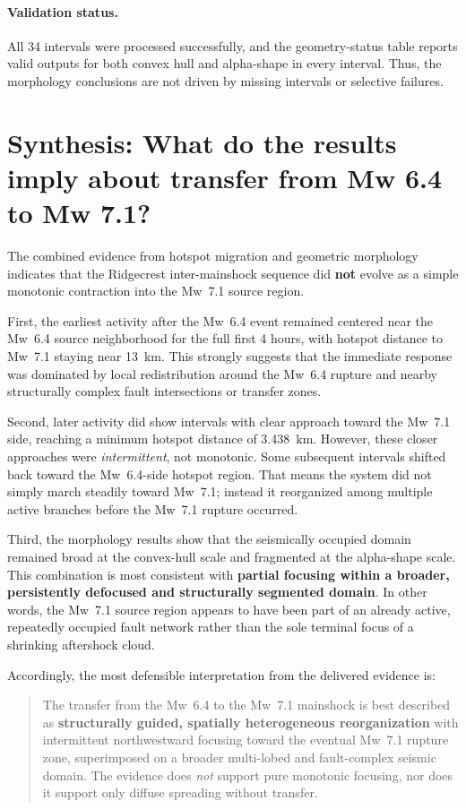 \documentclass[11pt]{article}
\begin{document}
\paragraph{Validation status.}
All 34 intervals were processed successfully, and the geometry-status table reports valid outputs for both convex hull and alpha-shape in every interval. Thus, the morphology conclusions are not driven by missing intervals or selective failures.

\section{Synthesis: What do the results imply about transfer from Mw 6.4 to Mw 7.1?}
The combined evidence from hotspot migration and geometric morphology indicates that the Ridgecrest inter-mainshock sequence did \textbf{not} evolve as a simple monotonic contraction into the Mw~7.1 source region.

First, the earliest activity after the Mw~6.4 event remained centered near the Mw~6.4 source neighborhood for the full first 4 hours, with hotspot distance to Mw~7.1 staying near 13~km. This strongly suggests that the immediate response was dominated by local redistribution around the Mw~6.4 rupture and nearby structurally complex fault intersections or transfer zones.

Second, later activity did show intervals with clear approach toward the Mw~7.1 side, reaching a minimum hotspot distance of 3.438~km. However, these closer approaches were \emph{intermittent}, not monotonic. Some subsequent intervals shifted back toward the Mw~6.4-side hotspot region. That means the system did not simply march steadily toward Mw~7.1; instead it reorganized among multiple active branches before the Mw~7.1 rupture occurred.

Third, the morphology results show that the seismically occupied domain remained broad at the convex-hull scale and fragmented at the alpha-shape scale. This combination is most consistent with \textbf{partial focusing within a broader, persistently defocused and structurally segmented domain}. In other words, the Mw~7.1 source region appears to have been part of an already active, repeatedly occupied fault network rather than the sole terminal focus of a shrinking aftershock cloud.

Accordingly, the most defensible interpretation from the delivered evidence is:
\begin{quote}
The transfer from the Mw~6.4 to the Mw~7.1 mainshock is best described as \textbf{structurally guided, spatially heterogeneous reorganization} with intermittent northwestward focusing toward the eventual Mw~7.1 rupture zone, superimposed on a broader multi-lobed and fault-complex seismic domain. The evidence does \emph{not} support pure monotonic focusing, nor does it support only diffuse spreading without transfer.
\end{quote}
\end{document}
